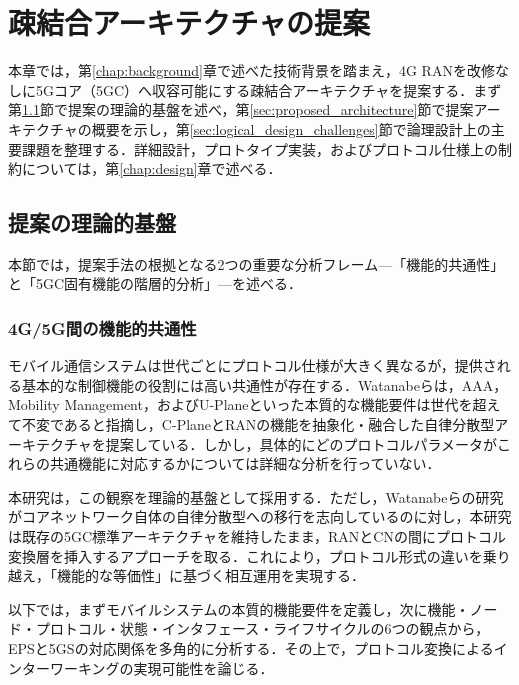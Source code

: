 \chapter{疎結合アーキテクチャの提案}
\label{chap:proposal}

本章では，第\ref{chap:background}章で述べた技術背景を踏まえ，4G RANを改修なしに5Gコア（5GC）へ収容可能にする疎結合アーキテクチャを提案する．まず第\ref{sec:proposal_theoretical_foundation}節で提案の理論的基盤を述べ，第\ref{sec:proposed_architecture}節で提案アーキテクチャの概要を示し，第\ref{sec:logical_design_challenges}節で論理設計上の主要課題を整理する．詳細設計，プロトタイプ実装，およびプロトコル仕様上の制約については，第\ref{chap:design}章で述べる．

\section{提案の理論的基盤}
\label{sec:proposal_theoretical_foundation}

本節では，提案手法の根拠となる2つの重要な分析フレーム---「機能的共通性」と「5GC固有機能の階層的分析」---を述べる．

\subsection{4G/5G間の機能的共通性}
\label{subsec:functional_commonality}

モバイル通信システムは世代ごとにプロトコル仕様が大きく異なるが，提供される基本的な制御機能の役割には高い共通性が存在する．Watanabeらは，AAA，Mobility Management，およびU-Planeといった本質的な機能要件は世代を超えて不変であると指摘し，C-PlaneとRANの機能を抽象化・融合した自律分散型アーキテクチャを提案している\cite{Watanabe_ADMobile2025}．しかし，具体的にどのプロトコルパラメータがこれらの共通機能に対応するかについては詳細な分析を行っていない．

本研究は，この観察を理論的基盤として採用する．ただし，Watanabeらの研究がコアネットワーク自体の自律分散型への移行を志向しているのに対し，本研究は既存の5GC標準アーキテクチャを維持したまま，RANとCNの間にプロトコル変換層を挿入するアプローチを取る．これにより，プロトコル形式の違いを乗り越え，「機能的な等価性」に基づく相互運用を実現する．

以下では，まずモバイルシステムの本質的機能要件を定義し，次に機能・ノード・プロトコル・状態・インタフェース・ライフサイクルの6つの観点から，EPSと5GSの対応関係を多角的に分析する．その上で，プロトコル変換によるインターワーキングの実現可能性を論じる．


